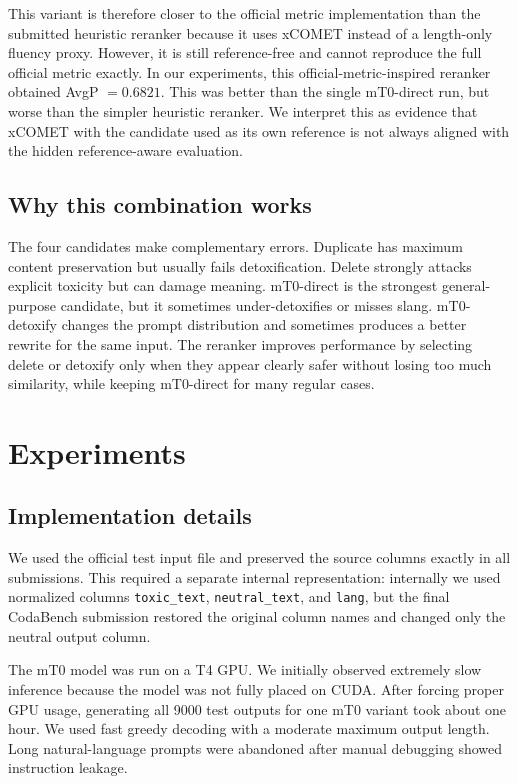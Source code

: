 \documentclass{article}
\begin{document}
This variant is therefore closer to the official metric implementation than the submitted heuristic reranker because it uses xCOMET instead of a length-only fluency proxy. However, it is still reference-free and cannot reproduce the full official metric exactly. In our experiments, this official-metric-inspired reranker obtained AvgP $=0.6821$. This was better than the single mT0-direct run, but worse than the simpler heuristic reranker. We interpret this as evidence that xCOMET with the candidate used as its own reference is not always aligned with the hidden reference-aware evaluation.

\subsection{Why this combination works}

The four candidates make complementary errors. Duplicate has maximum content preservation but usually fails detoxification. Delete strongly attacks explicit toxicity but can damage meaning. mT0-direct is the strongest general-purpose candidate, but it sometimes under-detoxifies or misses slang. mT0-detoxify changes the prompt distribution and sometimes produces a better rewrite for the same input. The reranker improves performance by selecting delete or detoxify only when they appear clearly safer without losing too much similarity, while keeping mT0-direct for many regular cases.

\section{Experiments}
\label{sec:experiments}

\subsection{Implementation details}

We used the official test input file and preserved the source columns exactly in all submissions. This required a separate internal representation: internally we used normalized columns \texttt{toxic\_text}, \texttt{neutral\_text}, and \texttt{lang}, but the final CodaBench submission restored the original column names and changed only the neutral output column.

The mT0 model was run on a T4 GPU. We initially observed extremely slow inference because the model was not fully placed on CUDA. After forcing proper GPU usage, generating all 9000 test outputs for one mT0 variant took about one hour. We used fast greedy decoding with a moderate maximum output length. Long natural-language prompts were abandoned after manual debugging showed instruction leakage.
\end{document}
